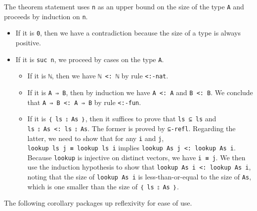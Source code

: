 The theorem statement uses \texttt{n} as an upper bound on the size of
the type \texttt{A} and proceeds by induction on \texttt{n}.

\begin{itemize}
\item
  If it is \texttt{0}, then we have a contradiction because the size of
  a type is always positive.
\item
  If it is \texttt{suc\ n}, we proceed by cases on the type \texttt{A}.

  \begin{itemize}
  \tightlist
  \item
    If it is \texttt{ℕ}, then we have \texttt{ℕ\ \textless{}:\ ℕ} by
    rule \texttt{\textless{}:-nat}.
  \item
    If it is \texttt{A\ ⇒\ B}, then by induction we have
    \texttt{A\ \textless{}:\ A} and \texttt{B\ \textless{}:\ B}. We
    conclude that \texttt{A\ ⇒\ B\ \textless{}:\ A\ ⇒\ B} by rule
    \texttt{\textless{}:-fun}.
  \item
    If it is \texttt{｛\ ls\ ⦂\ As\ ｝}, then it suffices to prove that
    \texttt{ls\ ⊆\ ls} and \texttt{ls\ ⦂\ As\ \textless{}:\ ls\ ⦂\ As}.
    The former is proved by \texttt{⊆-refl}. Regarding the latter, we
    need to show that for any \texttt{i} and \texttt{j},
    \texttt{lookup\ ls\ j\ ≡\ lookup\ ls\ i} implies
    \texttt{lookup\ As\ j\ \textless{}:\ lookup\ As\ i}. Because
    \texttt{lookup} is injective on distinct vectors, we have
    \texttt{i\ ≡\ j}. We then use the induction hypothesis to show that
    \texttt{lookup\ As\ i\ \textless{}:\ lookup\ As\ i}, noting that the
    size of \texttt{lookup\ As\ i} is less-than-or-equal to the size of
    \texttt{As}, which is one smaller than the size of
    \texttt{｛\ ls\ ⦂\ As\ ｝}.
  \end{itemize}
\end{itemize}

The following corollary packages up reflexivity for ease of use.

\begin{fence}
\begin{code}%
\>[0]\AgdaSpace{}%
\AgdaSymbol{:}\AgdaSpace{}%
\AgdaSymbol{\}}\AgdaSpace{}%
\AgdaSpace{}%
\AgdaSpace{}%
\AgdaOperator{\AgdaDatatype{<:}}\AgdaSpace{}%
\<%
\\
\>[0]\AgdaSpace{}%
\AgdaSymbol{\{}\AgdaSymbol{\}}\AgdaSpace{}%
\AgdaSymbol{=}\AgdaSpace{}%
\AgdaSpace{}%
\AgdaSymbol{\{}\AgdaSpace{}%
\AgdaSymbol{\}\{}\AgdaSymbol{\}\{}\AgdaSymbol{\}}\<%
\end{code}
\end{fence}

